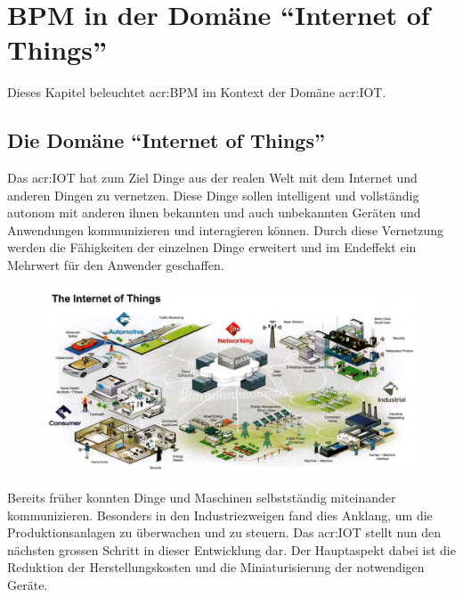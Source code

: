 
\chapter{BPM in der Domäne "`Internet of Things"'}
Dieses Kapitel beleuchtet \gls{acr:BPM} im Kontext der Domäne \gls{acr:IOT}.

\section{Die Domäne "`Internet of Things"'}
Das \gls{acr:IOT} hat zum Ziel Dinge aus der realen Welt mit dem Internet und anderen Dingen zu vernetzen. Diese Dinge sollen intelligent und vollständig autonom mit anderen ihnen bekannten und auch unbekannten Geräten und Anwendungen kommunizieren und interagieren können. Durch diese Vernetzung werden die Fähigkeiten der einzelnen Dinge erweitert und im Endeffekt ein Mehrwert für den Anwender geschaffen.

\begin{figure}[H]
 \centering
  \includegraphics[width=16cm]{./images/freescale_internet_of_things_overview_1}
\end{figure}

Bereits früher konnten Dinge und Maschinen selbstständig miteinander kommunizieren. Besonders in den Industriezweigen fand dies Anklang, um die Produktionsanlagen zu überwachen und zu steuern. Das \gls{acr:IOT} stellt nun den nächsten grossen Schritt in dieser Entwicklung dar. Der Hauptaspekt dabei ist die Reduktion der Herstellungskosten und die Miniaturisierung der notwendigen Geräte.

